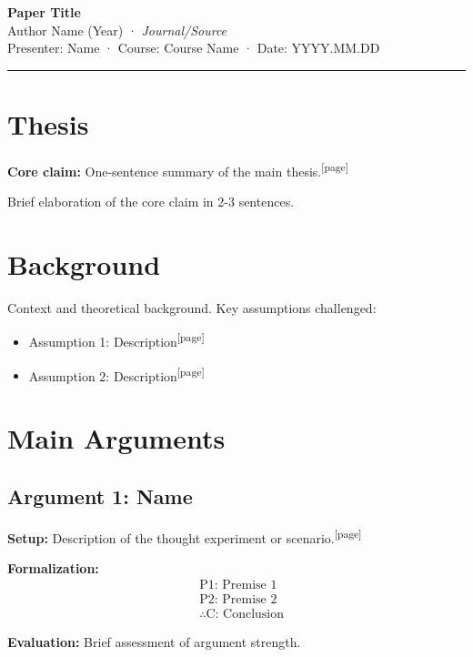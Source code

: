 \documentclass[10pt, a4paper]{article}
\title{}
\author{}
\date{}
\newcommand{\pagemark}[1]{\textsuperscript{\scriptsize[#1]}}
\begin{document}

{\centering
  {\Large\bfseries\sffamily Paper Title}\\[3pt]
  {\normalsize Author Name (Year) · \textit{Journal/Source}}\\[4pt]
  Presenter: Name · Course: Course Name · Date: YYYY.MM.DD\par
}

\vspace{0.3em}
\hrule
\vspace{0.5em}

\section*{Thesis}

\textbf{Core claim:} One-sentence summary of the main thesis.\pagemark{page}

Brief elaboration of the core claim in 2-3 sentences.

\section*{Background}

Context and theoretical background. Key assumptions challenged:
\begin{itemize}
  \item Assumption 1: Description\pagemark{page}
  \item Assumption 2: Description\pagemark{page}
\end{itemize}

\section*{Main Arguments}

\subsection*{Argument 1: Name}

\textbf{Setup:} Description of the thought experiment or scenario.\pagemark{page}

\textbf{Formalization:}
\begin{align*}
  &\text{P1: Premise 1} \\
  &\text{P2: Premise 2} \\
  &\therefore \text{C: Conclusion}
\end{align*}

\textbf{Evaluation:} Brief assessment of argument strength.
\end{document}
